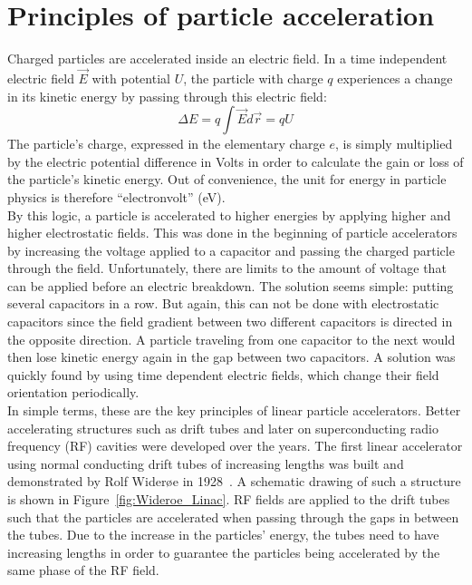 \section{Principles of particle acceleration}
\label{AccPhysics:Principles}
Charged particles are accelerated inside an electric field. 
In a time independent electric field $\vec{E}$ with potential $U$, the particle with charge $q$ experiences a change in its kinetic energy by passing through this electric field:
\begin{equation}
 \Delta E = q \int \vec{E}d\vec{r} = qU
\end{equation}
The particle's charge, expressed in the elementary charge $e$, is simply multiplied by the electric potential difference in Volts in order to calculate the gain or loss of the particle's kinetic energy. 
Out of convenience, the unit for energy in particle physics is therefore ``electronvolt'' (eV).\\
By this logic, a particle is accelerated to higher energies by applying higher and higher electrostatic fields. 
This was done in the beginning of particle accelerators by increasing the voltage applied to a capacitor and passing the charged particle through the field. 
Unfortunately, there are limits to the amount of voltage that can be applied before an electric breakdown.
The solution seems simple: putting several capacitors in a row.
But again, this can not be done with electrostatic capacitors since the field gradient between two different capacitors is directed in the opposite direction.
A particle traveling from one capacitor to the next would then lose kinetic energy again in the gap between two capacitors.
A solution was quickly found by using time dependent electric fields, which change their field  orientation periodically.\\
In simple terms, these are the key principles of linear particle accelerators.
Better accelerating structures such as drift tubes and later on superconducting radio frequency (RF) cavities were developed over the years.
The first linear accelerator using normal conducting drift tubes of increasing lengths was built and demonstrated by Rolf Wider\o e in 1928~\cite[p. 6]{Wilson}.
A schematic drawing of such a structure is shown in Figure~\ref{fig:Wideroe_Linac}.
RF fields are applied to the drift tubes such that the particles are accelerated when passing through the gaps in between the tubes.
Due to the increase in the particles' energy, the tubes need to have increasing lengths in order to guarantee the particles being accelerated by the same phase of the RF field.
